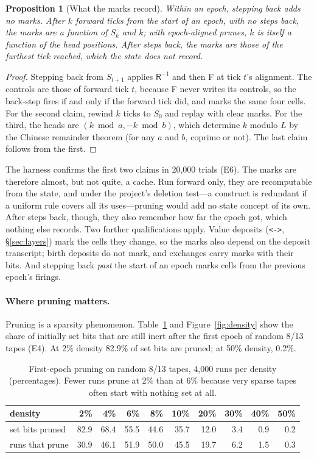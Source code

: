 \documentclass[11pt]{article}
\newtheorem{proposition}[theorem]{Proposition}
\theoremstyle{definition}
\theoremstyle{remark}
\newcommand{\code}[1]{\texttt{#1}}
\begin{document}
\begin{proposition}[What the marks record]
\label{prop:marks}
Within an epoch, stepping back adds no marks. After $k$ forward ticks from
the start of an epoch, with no steps back, the marks are a function of
$S_k$ and $k$; with epoch-aligned prunes, $k$ is itself a function of the
head positions. After steps back, the marks are those of the furthest
tick reached, which the state does not record.
\end{proposition}
\begin{proof}
Stepping back from $S_{t+1}$ applies $\textsf{R}^{-1}$ and then
\textsf{F} at tick $t$'s alignment. The controls are those of forward
tick $t$, because \textsf{F} never writes its controls, so the back-step
fires if and only if the forward tick did, and marks the same four cells.
For the second claim, rewind $k$ ticks to $S_0$ and replay with clear
marks. For the third, the heads are $(k\bmod a,-k\bmod b)$, which
determine $k$ modulo $L$ by the Chinese remainder theorem (for any $a$
and $b$, coprime or not). The last claim follows from the first.
\end{proof}

The harness confirms the first two claims in 20,000 trials (E6). The
marks are therefore almost, but not quite, a cache. Run forward only,
they are recomputable from the state, and under the project's deletion
test---a construct is redundant if a uniform rule covers all its
uses---pruning would add no state concept of its own. After steps back,
though, they also remember how far the epoch got, which nothing else
records. Two further qualifications apply. Value deposits
(\code{<->}, \S\ref{sec:layers}) mark the cells they change, so the
marks also depend on the deposit transcript; birth deposits do not mark,
and exchanges carry marks with their bits. And stepping back \emph{past}
the start of an epoch marks cells from the previous epoch's firings.

\paragraph{Where pruning matters.}
Pruning is a sparsity phenomenon. Table~\ref{tab:density} and
Figure~\ref{fig:density} show the share of initially set bits that are
still inert after the first epoch of random 8/13 tapes (E4). At 2\%
density 82.9\% of set bits are pruned; at 50\% density, 0.2\%.

\begin{table}[t]
\centering
\small
\begin{tabular}{@{}l r r r r r r r r r@{}}
\toprule
density & 2\% & 4\% & 6\% & 8\% & 10\% & 20\% & 30\% & 40\% & 50\% \\
\midrule
set bits pruned & 82.9 & 68.4 & 55.5 & 44.6 & 35.7 & 12.0 & 3.4 & 0.9 & 0.2 \\
runs that prune & 30.9 & 46.1 & 51.9 & 50.0 & 45.5 & 19.7 & 6.2 & 1.5 & 0.3 \\
\bottomrule
\end{tabular}
\caption{First-epoch pruning on random 8/13 tapes, 4,000 runs per
density (percentages). Fewer runs prune at 2\% than at 6\% because very
sparse tapes often start with nothing set at all.}
\label{tab:density}
\end{table}
\end{document}
